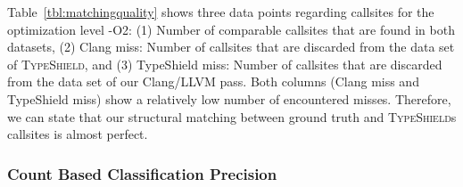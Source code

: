 Table~\ref{tbl:matchingquality} shows three data points regarding callsites for the optimization level -O2:
(1) Number of comparable callsites that are found in both datasets,
(2) Clang miss: Number of callsites that are discarded from the data set of \textsc{TypeShield}, and
(3) TypeShield miss: Number of callsites that are discarded from the data set of our Clang/LLVM pass.
Both columns (Clang miss and TypeShield miss) show a relatively low number of encountered misses. Therefore, we can 
state that our structural matching between ground truth and \textsc{TypeShield}s callsites is almost perfect.

\subsubsection{Count Based Classification Precision}
\label{subsection:typeshieldcountprecision}

\texttt{}

